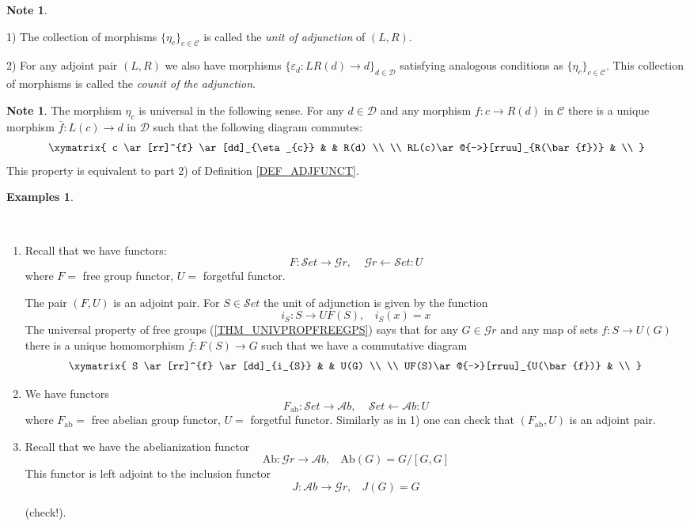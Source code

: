 \documentclass[12pt, letterpaper, oneside]{article}
\theoremstyle{plain}
\theoremstyle{definition}
\newtheorem{examples}[theorem]{Examples}
\newtheorem{note}[theorem]{Note}
\newcommand{\la}{\leftarrow}
\newcommand{\CC}{{\mathcal C}}
\newcommand{\DD}{{\mathcal D}}
\newcommand{\Ab}{{\mathcal Ab}}
\newcommand{\Gr}{{\mathcal Gr}}
\newcommand{\Set}{{\mathcal Set}}
\newcommand{\benu}{\begin{enumerate}}
\newcommand{\eenu}{\end{enumerate}}
\newcommand{\vs}{\vskip 5mm}
\newcommand{\isep}[1][0]{\setlength{\itemsep}{#1 mm}}
\begin{document}
\vs

\begin{note}\ 

\vskip -2mm

1) The collection of morphisms $\{ \eta_{c} \}_{c\in \CC}$ is called the \emph{unit of  adjunction}
of $(L, R)$.

2) For  any adjoint pair $(L, R)$ we also have morphisms $\{ \varepsilon_{d} \colon LR(d) \to d \}_{d\in\DD}$
satisfying analogous conditions as $\{ \eta_{c} \}_{c\in \CC}$. 
This collection of morphisms is called the \emph{counit of the  adjunction}. 
\end{note}

\vs 

\begin{note}
The morphism $\eta_{c}$ is universal in the following sense. For any $d\in \DD$ and 
any morphism $f\colon c \to R(d)$ in $\CC$  there is a unique morphism $\bar{f}\colon L(c) \to d$
in $\DD$ such that the following diagram commutes:
$$
\xymatrix{
c \ar[rr]^{f} \ar[dd]_{\eta_{c}} & & R(d) \\
\\
RL(c)\ar@{-->}[rruu]_{R(\bar{f})} & \\
}
$$
This property is equivalent to part 2) of Definition \ref{DEF_ADJFUNCT}.
\end{note}

\vs\vs

\begin{examples}\ 

\vskip -13mm

\ 
\benu
\isep[6]
\item Recall that we have functors:
$$F\colon \Set \to \Gr,  \ \ \ \ \  \Gr \la \Set\colon U $$
where $F = $ free group functor, $U  = $ forgetful functor.

The pair $(F, U)$ is an adjoint pair. For $S\in \Set$ the unit of adjunction is given by the function
$$i_{S}\colon S \to UF(S), \ \ \ \ i_{S}(x) = x$$
The universal property of free groups (\ref{THM_UNIVPROPFREEGPS}) says that for any 
$G\in \Gr$ and any map of sets $f\colon S \to U(G)$ there is a unique homomorphism 
$\bar{f} \colon F(S) \to G$ such that we have a commutative diagram
$$
\xymatrix{
S \ar[rr]^{f} \ar[dd]_{i_{S}} & & U(G) \\
\\
UF(S)\ar@{-->}[rruu]_{U(\bar{f})} & \\
}
$$

\item We have functors
$$F_{\text{ab}}\colon \Set \to \Ab, \ \ \ \ \  \Set \la \Ab\colon U$$
where $F_{\text{ab}} = $ free abelian group functor, $U  = $ forgetful functor. Similarly as in 1) 
one can check that $(F_{\text{ab}}, U)$ is an adjoint pair.

\item Recall that we have the abelianization functor
$$\mathrm{Ab}\colon \Gr \to \Ab, \ \ \ \ \mathrm{Ab}(G) = G/[G, G]$$
This functor is left adjoint to the inclusion functor
$$J\colon \Ab \to \Gr, \ \ \ \ J(G) = G$$

\vskip -5mm

(check!).
\eenu
\end{examples}
\end{document}

